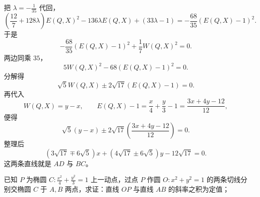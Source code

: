 \begin{solution}
把 $\lambda = -\frac{1}{35}$ 代回，
\[
\left( \frac{12}{7} + 128\lambda \right) E(Q,X)^2 - 136\lambda E(Q,X) + (33\lambda - 1)
= -\frac{68}{35}(E(Q,X)-1)^2.
\]
于是
\[
-\frac{68}{35}(E(Q,X) - 1)^2 + \frac{1}{7}W(Q,X)^2 = 0.
\]
两边同乘 $35$，
\[
5W(Q,X)^2 - 68(E(Q,X) - 1)^2 = 0.
\]
分解得
\[
\sqrt{5}W(Q,X) \pm 2\sqrt{17}(E(Q,X) - 1) = 0.
\]
再代入
\[
W(Q,X)=y-x,\qquad E(Q,X)-1=\frac{x}{4}+\frac{y}{3}-1=\frac{3x+4y-12}{12},
\]
便得
\[
\sqrt{5}(y - x) \pm 2\sqrt{17}\left(\frac{3x+4y-12}{12}\right) = 0.
\]
整理后
\[
(3\sqrt{17} \mp 6\sqrt{5})x + (4\sqrt{17} \pm 6\sqrt{5})y - 12\sqrt{17} = 0.
\]
这两条直线就是 $AD$ 与 $BC$。
\end{solution}

\begin{exercise}
    已知 \(P\) 为椭圆 \(C: \frac{x^2}{4} + \frac{y^2}{3} = 1\) 上一动点，过点 \(P\) 作圆 \(O: x^2 + y^2 = 1\) 的两条切线分别交椭圆 \(C\) 于 \(A,B\) 两点，求证：直线 \(OP\) 与直线 \(AB\) 的斜率之积为定值；
\end{exercise}
